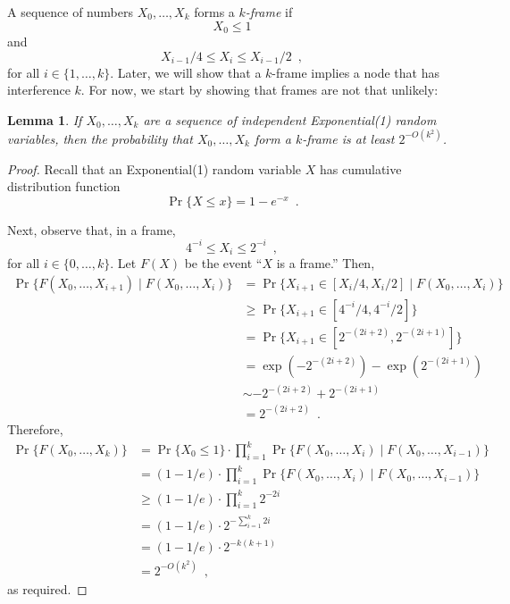 \documentclass{article}
\newtheorem{lem}{Lemma}
\begin{document}
A sequence of numbers $X_0,\ldots,X_k$ forms a \emph{$k$-frame} if
\[
     X_0 \le 1
\]
and
\[
     X_{i-1}/4 \le X_i \le X_{i-1}/2 \enspace ,
\]
for all $i\in\{1,\ldots,k\}$.  Later, we will show that a $k$-frame
implies a node that has interference $k$.  For now, we start by showing
that frames are not that unlikely:

\begin{lem}
If $X_0,\ldots,X_k$ are a sequence of independent Exponential(1) random
variables, then the probability that $X_0,\ldots,X_k$ form a $k$-frame
is at least $2^{-O(k^2)}$.
\end{lem}

\begin{proof}
Recall that an Exponential(1) random variable $X$ has cumulative
distribution function
\[
   \Pr\{X \le x\} = 1-e^{-x} \enspace .
\]

Next, observe that, in a frame,
\[
                 4^{-i} \le X_i \le 2^{-i}  \enspace ,
\]
for all $i\in\{0,\ldots,k\}$.  Let $F(X)$ be the event ``$X$ is a frame.''
Then,
\begin{align*}
     \Pr\{F(X_0,\ldots,X_{i+1}) \mid F(X_0,\ldots,X_{i})\} 
        & = \Pr\{X_{i+1} \in [X_{i}/4,X_{i}/2] \mid F(X_0,\ldots,X_{i})\} \\
        & \ge \Pr\{X_{i+1} \in [4^{-i}/4,4^{-i}/2]\} \\
        & = \Pr\{X_{i+1} \in [2^{-(2i+2)},2^{-(2i+1)}]\} \\
        & = \exp(-2^{-(2i+2)}) - \exp(2^{-(2i+1)}) \\
        & \sim -2^{-(2i+2)} + 2^{-(2i+1)} \\
        & = 2^{-(2i+2)} \enspace .
\end{align*}
Therefore,
\begin{align*}
     \Pr\{F(X_0,\ldots,X_{k})\}
   & = \Pr\{X_0\le 1\}
         \cdot\prod_{i=1}^k \Pr\{F(X_0,\ldots,X_{i})
                                 \mid F(X_0,\ldots,X_{i-1})\} \\
   & = (1-1/e)
         \cdot\prod_{i=1}^k \Pr\{F(X_0,\ldots,X_{i})
                                 \mid F(X_0,\ldots,X_{i-1})\} \\
   & \ge (1-1/e)\cdot\prod_{i=1}^k 2^{-2i} \\
   & = (1-1/e)\cdot2^{-\sum_{i=1}^k 2i} \\
   & = (1-1/e)\cdot2^{-k(k+1)} \\
   & = 2^{-O(k^2)} \enspace ,
\end{align*}
as required.
\end{proof}
\end{document}
